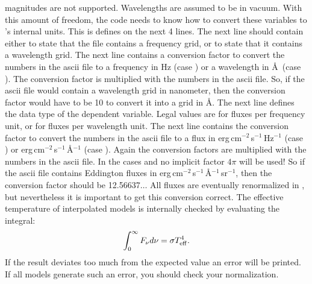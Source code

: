 magnitudes are not supported. Wavelengths are assumed to be in vacuum.
With this amount of freedom, the code needs to
know how to convert these variables to \Cloudy's internal units. This is
defines on the next 4 lines. The next line should contain either
 to state that the file contains a frequency grid, or
 to state that it contains a wavelength grid. The next line
contains a conversion factor to convert the numbers in the ascii file to a
frequency in Hz (case ) or a wavelength in \AA\ (case
). The conversion factor is multiplied with the numbers in
the ascii file. So, if the ascii file would contain a wavelength grid in
nanometer, then the conversion factor would have to be 10 to convert it into a
grid in \AA. The next line defines the data type of the dependent variable.
Legal values are  for fluxes per frequency unit, or
 for fluxes per wavelength unit. The next
line contains the conversion factor to convert the numbers in the ascii file
to a flux in erg\,cm$^{-2}$\,s$^{-1}$\,Hz$^{-1}$ (case ) or erg\,cm$^{-2}$\,s$^{-1}$\,\AA$^{-1}$ (case ). Again the conversion factors are multiplied with the numbers in
the ascii file. In the cases  and  no
implicit factor $4\pi$ will be used! So if the ascii file contains Eddington
fluxes  in erg\,cm$^{-2}$\,s$^{-1}$\,\AA$^{-1}$\,sr$^{-1}$,
then the conversion factor should be 12.56637$\ldots$ All fluxes are
eventually renormalized in \Cloudy, but nevertheless it is important to get
this conversion correct. The effective temperature of interpolated models is
internally checked by evaluating the integral:
\[ \int_0^\infty F_\nu d \nu = \sigma T_{\rm eff}^4. \]
If the result deviates too much from the expected value an error will be
printed. If all models generate such an error, you should check your
normalization.

